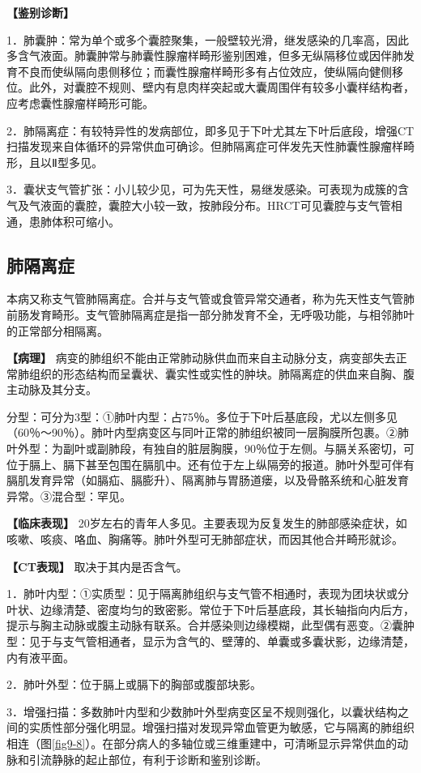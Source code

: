 \textbf{【鉴别诊断】}

1．肺囊肿：常为单个或多个囊腔聚集，一般壁较光滑，继发感染的几率高，因此多含气液面。肺囊肿常与肺囊性腺瘤样畸形鉴别困难，但多无纵隔移位或因伴肺发育不良而使纵隔向患侧移位；而囊性腺瘤样畸形多有占位效应，使纵隔向健侧移位。此外，对囊腔不规则、壁内有息肉样突起或大囊周围伴有较多小囊样结构者，应考虑囊性腺瘤样畸形可能。

2．肺隔离症：有较特异性的发病部位，即多见于下叶尤其左下叶后底段，增强CT扫描发现来自体循环的异常供血可确诊。但肺隔离症可伴发先天性肺囊性腺瘤样畸形，且以Ⅱ型多见。

3．囊状支气管扩张：小儿较少见，可为先天性，易继发感染。可表现为成簇的含气及气液面的囊腔，囊腔大小较一致，按肺段分布。HRCT可见囊腔与支气管相通，患肺体积可缩小。

\subsection{肺隔离症}

本病又称支气管肺隔离症。合并与支气管或食管异常交通者，称为先天性支气管肺前肠发育畸形。支气管肺隔离症是指一部分肺发育不全，无呼吸功能，与相邻肺叶的正常部分相隔离。

\textbf{【病理】}
病变的肺组织不能由正常肺动脉供血而来自主动脉分支，病变部失去正常肺组织的形态结构而呈囊状、囊实性或实性的肿块。肺隔离症的供血来自胸、腹主动脉及其分支。

分型：可分为3型：①肺叶内型：占75％。多位于下叶后基底段，尤以左侧多见（60％～90％）。肺叶内型病变区与同叶正常的肺组织被同一层胸膜所包裹。②肺叶外型：为副叶或副肺段，有独自的脏层胸膜，90％位于左侧。与膈关系密切，可位于膈上、膈下甚至包围在膈肌中。还有位于左上纵隔旁的报道。肺叶外型可伴有膈肌发育异常（如膈疝、膈膨升）、隔离肺与胃肠道瘘，以及骨骼系统和心脏发育异常。③混合型：罕见。

\textbf{【临床表现】}
20岁左右的青年人多见。主要表现为反复发生的肺部感染症状，如咳嗽、咳痰、咯血、胸痛等。肺叶外型可无肺部症状，而因其他合并畸形就诊。

\textbf{【CT表现】} 取决于其内是否含气。

1．肺叶内型：①实质型：见于隔离肺组织与支气管不相通时，表现为团块状或分叶状、边缘清楚、密度均匀的致密影。常位于下叶后基底段，其长轴指向内后方，提示与胸主动脉或腹主动脉有联系。合并感染则边缘模糊，此型偶有恶变。②囊肿型：见于与支气管相通者，显示为含气的、壁薄的、单囊或多囊状影，边缘清楚，内有液平面。

2．肺叶外型：位于膈上或膈下的胸部或腹部块影。

3．增强扫描：多数肺叶内型和少数肺叶外型病变区呈不规则强化，以囊状结构之间的实质性部分强化明显。增强扫描对发现异常血管更为敏感，它与隔离的肺组织相连（图\ref{fig9-8}）。在部分病人的多轴位或三维重建中，可清晰显示异常供血的动脉和引流静脉的起止部位，有利于诊断和鉴别诊断。



